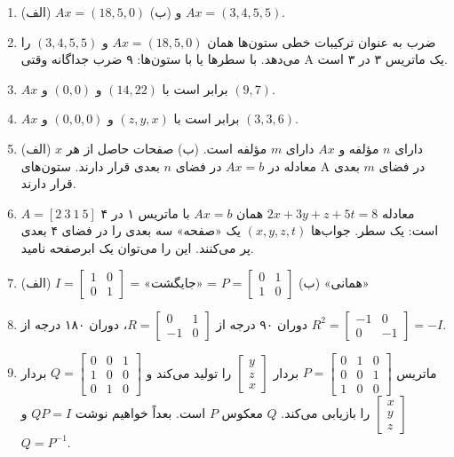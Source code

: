 \documentclass[12pt]{article}
\begin{document}
\begin{enumerate}
		\item (الف) $Ax=(18,5,0)$ و (ب) $Ax=(3,4,5,5)$.
		
		\item ضرب به عنوان ترکیبات خطی ستون‌ها همان $Ax=(18,5,0)$ و $(3,4,5,5)$ را می‌دهد. با سطرها یا با ستون‌ها: ۹ ضرب جداگانه وقتی A یک ماتریس ۳ در ۳ است.
		
		\item $Ax$ برابر است با $(14,22)$ و $(0,0)$ و $(9,7)$.
		
		\item $Ax$ برابر است با $(z,y,x)$ و $(0,0,0)$ و $(3,3,6)$.
		
		\item (الف) $x$ دارای $n$ مؤلفه و $Ax$ دارای $m$ مؤلفه است. (ب) صفحات حاصل از هر معادله در $Ax=b$ در فضای $n$ بعدی قرار دارند. ستون‌های A در فضای $m$ بعدی قرار دارند.
		
		\item معادله $2x+3y+z+5t=8$ همان $Ax=b$ با ماتریس ۱ در ۴ $A=[2 \ 3 \ 1 \ 5]$ است: یک سطر. جواب‌ها $(x,y,z,t)$ یک «صفحه» سه بعدی را در فضای ۴ بعدی پر می‌کنند. این را می‌توان یک ابرصفحه نامید.
		
		\item (الف) $I= \begin{bmatrix} 1 & 0 \\ 0 & 1 \end{bmatrix}$ = «همانی» (ب) $P= \begin{bmatrix} 0 & 1 \\ 1 & 0 \end{bmatrix}$ = «جایگشت»
		
		\item دوران ۹۰ درجه از $R= \begin{bmatrix} 0 & 1 \\ -1 & 0 \end{bmatrix}$، دوران ۱۸۰ درجه از $R^2= \begin{bmatrix} -1 & 0 \\ 0 & -1 \end{bmatrix} =-I$.
		
		\item ماتریس $P= \begin{bmatrix} 0 & 1 & 0 \\ 0 & 0 & 1 \\ 1 & 0 & 0 \end{bmatrix}$ بردار $\begin{bmatrix} y \\ z \\ x \end{bmatrix}$ را تولید می‌کند و $Q= \begin{bmatrix} 0 & 0 & 1 \\ 1 & 0 & 0 \\ 0 & 1 & 0 \end{bmatrix}$ بردار $\begin{bmatrix} x \\ y \\ z \end{bmatrix}$ را بازیابی می‌کند. $Q$ معکوس $P$ است. بعداً خواهیم نوشت $QP=I$ و $Q=P^{-1}$.
		

\end{enumerate}
\end{document}
